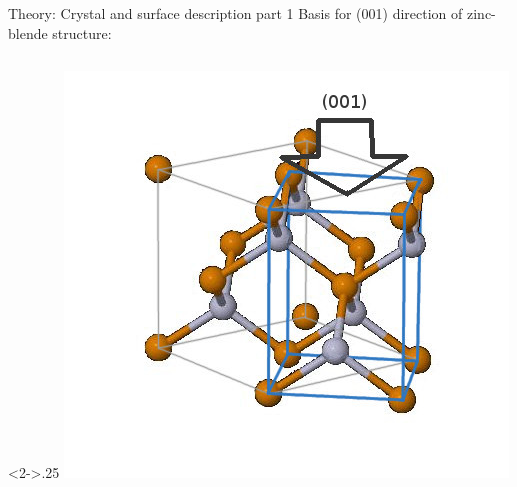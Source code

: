 \begin{frame}{Theory: Crystal and surface description part 1}
	Basis for (001) direction of zinc-blende structure: 
	\begin{columns}
		\hspace{-1cm}
		\begin{column}<2->{.25\linewidth}
			\includegraphics[width=1.2\linewidth]{andere_bilder/zinc_blende_45degree.jpg}

\end{column}
\end{columns}
\end{frame}
